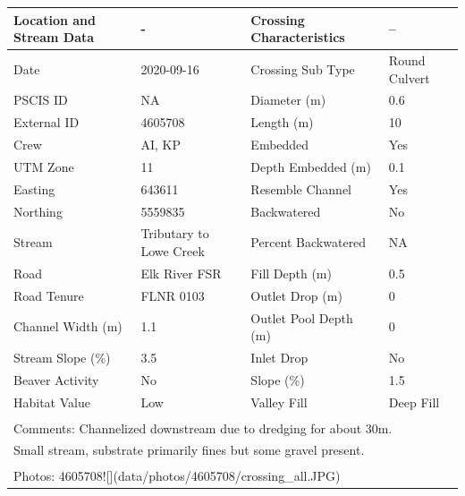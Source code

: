 \documentclass[
]{book}
\begin{document}
\begin{tabular}{llll}
\toprule
Location and Stream Data & - & Crossing Characteristics & --\\
\midrule
Date & 2020-09-16 & Crossing Sub Type & Round Culvert\\
PSCIS ID & NA & Diameter (m) & 0.6\\
External ID & 4605708 & Length (m) & 10\\
Crew & AI, KP & Embedded & Yes\\
UTM Zone & 11 & Depth Embedded (m) & 0.1\\
\addlinespace
Easting & 643611 & Resemble Channel & Yes\\
Northing & 5559835 & Backwatered & No\\
Stream & Tributary to Lowe Creek & Percent Backwatered & NA\\
Road & Elk River FSR & Fill Depth (m) & 0.5\\
Road Tenure & FLNR 0103 & Outlet Drop (m) & 0\\
\addlinespace
Channel Width (m) & 1.1 & Outlet Pool Depth (m) & 0\\
Stream Slope (\%) & 3.5 & Inlet Drop & No\\
Beaver Activity & No & Slope (\%) & 1.5\\
Habitat Value & Low & Valley Fill & Deep Fill\\
\bottomrule
\multicolumn{4}{l}{\textsuperscript{} Comments: Channelized downstream due to dredging for about 30m.}\\
\multicolumn{4}{l}{Small stream, substrate primarily fines but some gravel present.}\\
\multicolumn{4}{l}{\textsuperscript{} Photos: 4605708![](data/photos/4605708/crossing\_all.JPG)}\\
\end{tabular}
\end{document}
